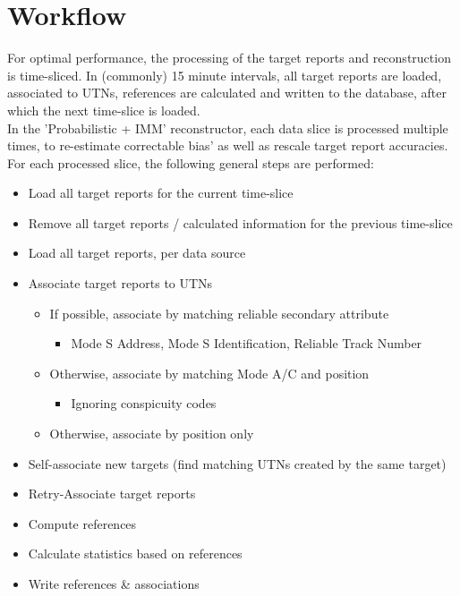\section{Workflow}

For optimal performance, the processing of the target reports and reconstruction is time-sliced. In (commonly) 15 minute intervals, all target reports are loaded, associated to UTNs, references are calculated and written to the database, after which the next time-slice is loaded. \\

In the 'Probabilistic + IMM' reconstructor, each data slice is processed multiple times, to re-estimate correctable bias' as well as rescale target report accuracies. \\

For each processed slice, the following general steps are performed:

\begin{itemize}
\item Load all target reports for the current time-slice
\item Remove all target reports / calculated information for the previous time-slice
\item Load all target reports, per data source
\item Associate target reports to UTNs
   \begin{itemize}  
   \item If possible, associate by matching reliable secondary attribute
    \begin{itemize}  
    \item Mode S Address, Mode S Identification, Reliable Track Number
    \end{itemize}
   \item Otherwise, associate by matching Mode A/C and position
    \begin{itemize}  
    \item Ignoring conspicuity codes
    \end{itemize}    
   \item Otherwise, associate by position only
   \end{itemize}
\item Self-associate new targets (find matching UTNs created by the same target)
\item Retry-Associate target reports
\item Compute references
\item Calculate statistics based on references
\item Write references \& associations
\end{itemize}
\ \\

